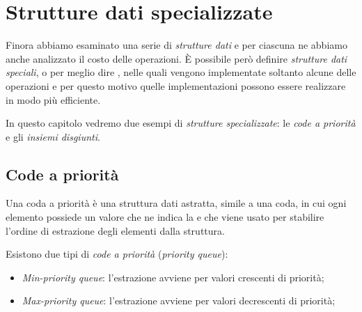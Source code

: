 \chapter{Strutture dati specializzate}
Finora abbiamo esaminato una serie di \emph{strutture dati} e per ciascuna
ne abbiamo anche analizzato il costo delle operazioni. È possibile però
definire \emph{strutture dati speciali}, o per meglio dire ,
nelle quali vengono implementate soltanto alcune delle operazioni e per questo
motivo quelle implementazioni possono essere realizzare in modo più efficiente.

In questo capitolo vedremo due esempi di \emph{strutture specializzate}: le
\emph{code a priorità} e gli \emph{insiemi disgiunti}.

\section{Code a priorità}
\begin{definition}
    Una coda a priorità è una struttura dati astratta, simile a una coda, in
    cui ogni elemento possiede un valore che ne indica la  e che
    viene usato per stabilire l'ordine di estrazione degli elementi dalla
    struttura.
\end{definition}

\noindent
Esistono due tipi di \emph{code a priorità} (\emph{priority queue}):
\begin{itemize}
    \item \emph{Min-priority queue}: l'estrazione avviene per valori crescenti
    di priorità;
    \item \emph{Max-priority queue}: l'estrazione avviene per valori decrescenti
    di priorità;
\end{itemize}

